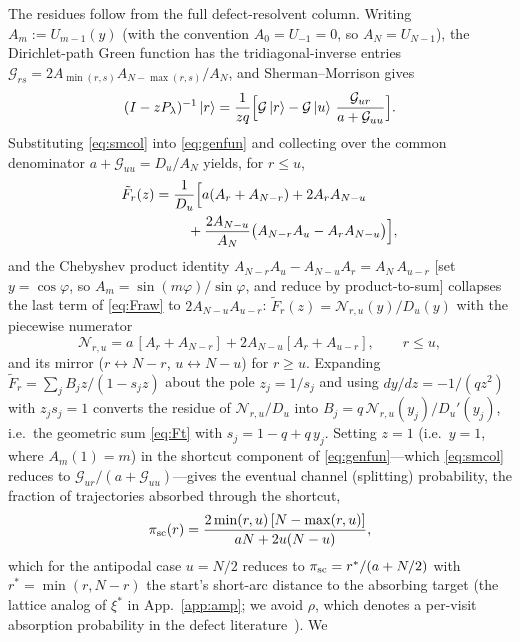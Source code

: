 \documentclass[reprint,amsmath,amssymb,aps,prresearch,longbibliography]{revtex4-2}
\begin{document}
The residues follow from the full defect-resolvent column. Writing $A_m:=U_{m-1}(y)$ (with the
convention $A_0=U_{-1}=0$, so $A_N=U_{N-1}$), the Dirichlet-path Green function has the
tridiagonal-inverse entries $\mathcal G_{rs}=2A_{\min(r,s)}A_{N-\max(r,s)}/A_N$, and
Sherman--Morrison gives
\begin{equation}
(I-zP_\lambda)^{-1}\ket{r}=\frac{1}{zq}\Big[\mathcal G\ket{r}
-\mathcal G\ket{u}\,\frac{\mathcal G_{ur}}{a+\mathcal G_{uu}}\Big].
\label{eq:smcol}
\end{equation}
Substituting \eqref{eq:smcol} into \eqref{eq:genfun} and collecting over the common denominator
$a+\mathcal G_{uu}=D_u/A_N$ yields, for $r\le u$,
\begin{align}
\tilde F_r(z)={}&\frac{1}{D_u}\Big[a(A_r+A_{N-r})+2A_rA_{N-u}\notag\\
&\quad+\frac{2A_{N-u}}{A_N}\big(A_{N-r}A_u-A_rA_{N-u}\big)\Big],
\label{eq:Fraw}
\end{align}
and the Chebyshev product identity $A_{N-r}A_u-A_{N-u}A_r=A_N\,A_{u-r}$ [set $y=\cos\varphi$, so
$A_m=\sin(m\varphi)/\sin\varphi$, and reduce by product-to-sum] collapses the last term of
\eqref{eq:Fraw} to $2A_{N-u}A_{u-r}$: $\tilde F_r(z)=\mathcal N_{r,u}(y)/D_u(y)$ with the piecewise
numerator
\begin{equation}
\mathcal N_{r,u}=a\,[A_r+A_{N-r}]+2A_{N-u}[A_r+A_{u-r}],\qquad r\le u,
\label{eq:num}
\end{equation}
and its mirror ($r\leftrightarrow N-r$, $u\leftrightarrow N-u$) for $r\ge u$. Expanding
$\tilde F_r=\sum_j B_j z/(1-s_jz)$ about the pole $z_j=1/s_j$ and using $dy/dz=-1/(qz^2)$ with
$z_js_j=1$ converts the residue of $\mathcal N_{r,u}/D_u$ into $B_j=q\,\mathcal
N_{r,u}(y_j)/D_u'(y_j)$, i.e.\ the geometric sum \eqref{eq:Ft} with $s_j=1-q+q\,y_j$. Setting $z=1$
(i.e.\ $y=1$, where $A_m(1)=m$) in the shortcut component of \eqref{eq:genfun}---which
\eqref{eq:smcol} reduces to $\mathcal G_{ur}/(a+\mathcal G_{uu})$---gives the eventual channel
(splitting) probability, the fraction of trajectories absorbed through the shortcut,
\begin{equation}
\pi_{\rm sc}(r)=\frac{2\min(r,u)\,[N-\max(r,u)]}{aN+2u(N-u)},
\label{eq:pisc}
\end{equation}
which for the antipodal case $u=N/2$ reduces to $\pi_{\rm sc}=r^*/(a+N/2)$ with $r^*=\min(r,N-r)$
the start's short-arc distance to the absorbing target (the lattice analog of
$\xi^*$ in App.~\ref{app:amp}; we avoid $\rho$, which denotes a per-visit absorption probability in
the defect literature~\cite{Giuggioli2020}). We
\end{document}
